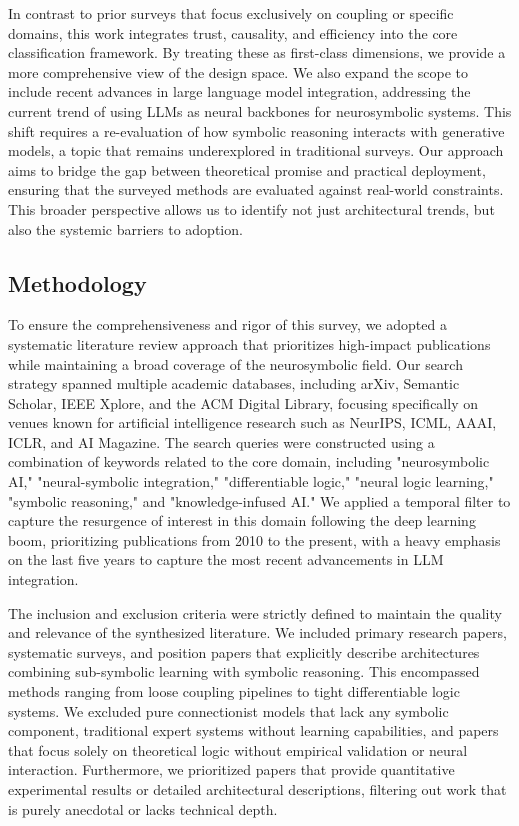 \documentclass{article}
\begin{document}
In contrast to prior surveys that focus exclusively on coupling or specific domains, this work integrates trust, causality, and efficiency into the core classification framework. By treating these as first-class dimensions, we provide a more comprehensive view of the design space. We also expand the scope to include recent advances in large language model integration, addressing the current trend of using LLMs as neural backbones for neurosymbolic systems. This shift requires a re-evaluation of how symbolic reasoning interacts with generative models, a topic that remains underexplored in traditional surveys. Our approach aims to bridge the gap between theoretical promise and practical deployment, ensuring that the surveyed methods are evaluated against real-world constraints. This broader perspective allows us to identify not just architectural trends, but also the systemic barriers to adoption.

\subsection{Methodology}

\label{sec:methodology}

To ensure the comprehensiveness and rigor of this survey, we adopted a systematic literature review approach that prioritizes high-impact publications while maintaining a broad coverage of the neurosymbolic field. Our search strategy spanned multiple academic databases, including arXiv, Semantic Scholar, IEEE Xplore, and the ACM Digital Library, focusing specifically on venues known for artificial intelligence research such as NeurIPS, ICML, AAAI, ICLR, and AI Magazine. The search queries were constructed using a combination of keywords related to the core domain, including "neurosymbolic AI," "neural-symbolic integration," "differentiable logic," "neural logic learning," "symbolic reasoning," and "knowledge-infused AI." We applied a temporal filter to capture the resurgence of interest in this domain following the deep learning boom, prioritizing publications from 2010 to the present, with a heavy emphasis on the last five years to capture the most recent advancements in LLM integration.

The inclusion and exclusion criteria were strictly defined to maintain the quality and relevance of the synthesized literature. We included primary research papers, systematic surveys, and position papers that explicitly describe architectures combining sub-symbolic learning with symbolic reasoning. This encompassed methods ranging from loose coupling pipelines to tight differentiable logic systems. We excluded pure connectionist models that lack any symbolic component, traditional expert systems without learning capabilities, and papers that focus solely on theoretical logic without empirical validation or neural interaction. Furthermore, we prioritized papers that provide quantitative experimental results or detailed architectural descriptions, filtering out work that is purely anecdotal or lacks technical depth.
\end{document}

